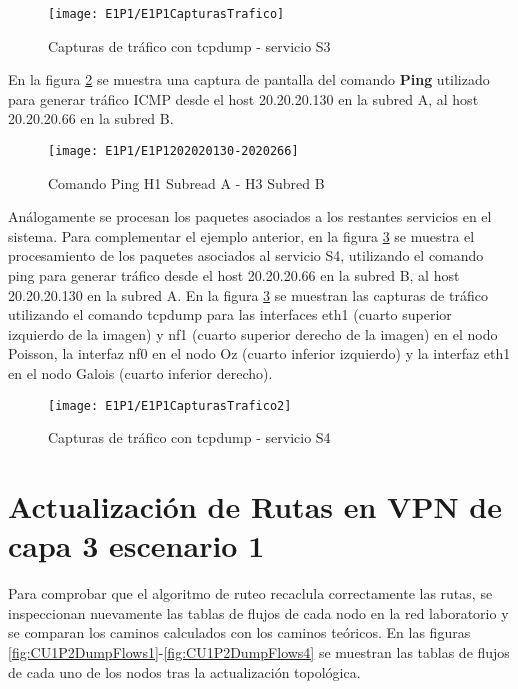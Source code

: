 \begin{figure}[h!] 
\centering    
\texttt{[image: E1P1/E1P1CapturasTrafico]}
\caption[Capturas de tr\'afico con tcpdump - servicio S3]{Capturas de tr\'afico con tcpdump - servicio S3}
\label{fig:LabE1P1CapsTraf}
\end{figure}

En la figura \ref{fig:LabE1P1CapHost} se muestra una captura de pantalla del comando \textbf{Ping} utilizado para generar tr\'afico ICMP desde el host 20.20.20.130 en la subred A, al host 20.20.20.66 en la subred B.

\newpage
\begin{figure}[ht!] 
\centering    
\texttt{[image: E1P1/E1P1202020130-2020266]}
\caption[Comando Ping H1 Subread A - H3 Subred B]{Comando Ping H1 Subread A - H3 Subred B}
\label{fig:LabE1P1CapHost}
\end{figure}

Análogamente se procesan los paquetes asociados a los restantes servicios en el sistema. Para complementar el ejemplo anterior, en la figura \ref{fig:LabE1P1CapsTraf2} se muestra el procesamiento de los paquetes asociados al servicio S4, utilizando el comando ping para generar tr\'afico desde el host 20.20.20.66 en la subred B, al host 20.20.20.130 en la subred A. En la figura \ref{fig:LabE1P1CapsTraf2} se muestran las capturas de tr\'afico utilizando el comando tcpdump para las interfaces eth1 (cuarto superior izquierdo de la imagen) y nf1 (cuarto superior derecho de la imagen) en el nodo Poisson, la interfaz nf0 en el nodo Oz (cuarto inferior izquierdo) y la interfaz eth1 en el nodo Galois (cuarto inferior derecho).

\begin{figure}[h!] 
\centering    
\texttt{[image: E1P1/E1P1CapturasTrafico2]}
\caption[Capturas de tr\'afico con tcpdump - servicio S4]{Capturas de tr\'afico con tcpdump - servicio S4}
\label{fig:LabE1P1CapsTraf2}
\end{figure}

\section{Actualización de Rutas en VPN de capa 3 escenario 1}
\label{appendix6.3}

Para comprobar que el algoritmo de ruteo recaclula correctamente las rutas, se inspeccionan nuevamente las tablas de flujos de cada nodo en la red laboratorio y se comparan los caminos calculados con los caminos te\'oricos. En las figuras \ref{fig:CU1P2DumpFlows1}-\ref{fig:CU1P2DumpFlows4} se muestran las tablas de flujos de cada uno de los nodos tras la actualización topol\'ogica.

